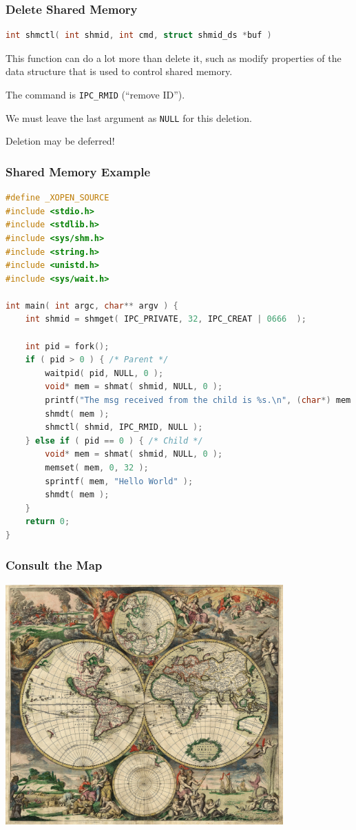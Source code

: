 \begin{frame}[fragile]
	\frametitle{Delete Shared Memory}
	\begin{lstlisting}[language=C]
int shmctl( int shmid, int cmd, struct shmid_ds *buf )
\end{lstlisting}

	This function can do a lot more than delete it, such as modify properties of the data structure that is used to control shared memory.

	The command is  \texttt{IPC\_RMID} (``remove ID'').

	We must leave the last argument as \texttt{NULL} for this deletion.

	Deletion may be deferred!

\end{frame}


\begin{frame}[fragile]
	\frametitle{Shared Memory Example}
	\begin{lstlisting}[language=C]
#define _XOPEN_SOURCE
#include <stdio.h>
#include <stdlib.h>
#include <sys/shm.h>
#include <string.h>
#include <unistd.h>
#include <sys/wait.h>

int main( int argc, char** argv ) { 
    int shmid = shmget( IPC_PRIVATE, 32, IPC_CREAT | 0666  );  

    int pid = fork();
    if ( pid > 0 ) { /* Parent */
        waitpid( pid, NULL, 0 );
        void* mem = shmat( shmid, NULL, 0 );
        printf("The msg received from the child is %s.\n", (char*) mem );
        shmdt( mem );
        shmctl( shmid, IPC_RMID, NULL );
    } else if ( pid == 0 ) { /* Child */
        void* mem = shmat( shmid, NULL, 0 );
        memset( mem, 0, 32 );
        sprintf( mem, "Hello World" );
        shmdt( mem );
    }   
    return 0;
}
\end{lstlisting}


\end{frame}


\begin{frame}
	\frametitle{Consult the Map}

	\begin{center}
		\includegraphics[width=0.8\textwidth]{images/worldmap.jpg}
	\end{center}


\end{frame}


